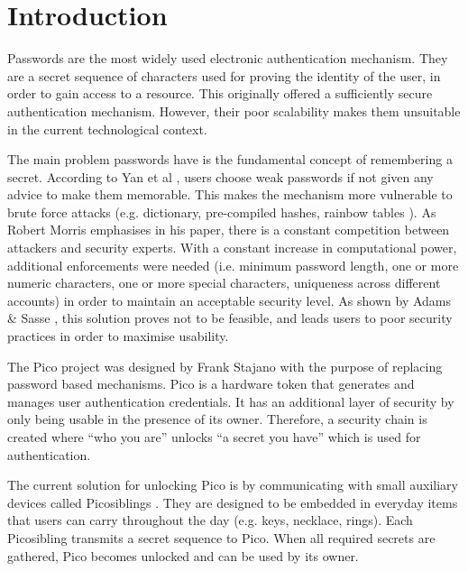 
\chapter{Introduction} %

\label{Chapter1}


Passwords are the most widely used electronic authentication mechanism. They are a secret sequence of characters used for proving the identity of the user, in order to gain access to a resource. This originally offered a sufficiently secure authentication mechanism. However, their poor scalability makes them unsuitable in the current technological context.

The main problem passwords have is the fundamental concept of remembering a secret. According to Yan et al \cite{yan2004password}, users choose weak passwords if not given any advice to make them memorable. This makes the mechanism more vulnerable to brute force attacks (e.g. dictionary, pre-compiled hashes, rainbow tables \cite{oechslin2003making}). As Robert Morris \cite{morris1979password} emphasises in his paper, there is a constant competition between attackers and security experts. With a constant increase in computational power, additional enforcements were needed (i.e. minimum password length, one or more numeric characters, one or more special characters, uniqueness across different accounts) in order to maintain an acceptable security level. As shown by Adams \& Sasse \cite{adams1999users}, this solution proves not to be feasible, and leads users to poor security practices in order to maximise usability.

The Pico project was designed by Frank Stajano \cite{stajano2011pico} with the purpose of replacing password based mechanisms. Pico is a hardware token that generates and manages user authentication credentials. It has an additional layer of security by only being usable in the presence of its owner. Therefore, a security chain is created where ``who you are'' unlocks ``a secret you have'' which is used for authentication.

The current solution for unlocking Pico is by communicating with small auxiliary devices called Picosiblings \cite{stannard2012good}. They are designed to be embedded in everyday items that users can carry throughout the day (e.g. keys, necklace, rings). Each Picosibling transmits a secret sequence to Pico. When all required secrets are gathered, Pico becomes unlocked and can be used by its owner.

